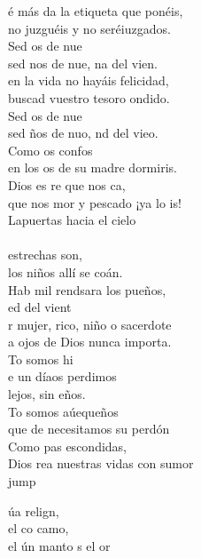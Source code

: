 \begin{cancion}%
	é más da la etiqueta que ponéis,\\
	no juzguéis y no seréiuzgados.\\
	Sed os de nue \\
	sed nos de nue, na del vien. \\
	 en la vida no hayáis felicidad,\\
	buscad vuestro tesoro ondido.\\
	Sed os de nue \\
	sed ños de nuo, nd del vieo.\\
	Como os confos \\
	en los os de su madre dormiris.\\
	Dios es re que nos ca,\\
	que nos mor y pescado ¡ya lo is!\\
	Lapuertas hacia el cielo \\
	\jump\\
estrechas son,\\
	los niños allí se coán.\\
	Hab mil rendsara los pueños,\\
	ed del vient\\
	r mujer, rico, niño o sacerdote\\
	a ojos de Dios nunca importa.\\
	To somos hi \\
	e un díaos perdimos\\
	 lejos, sin eños.\\
	To somos aúequeños\\
	que de  necesitamos su perdón\\
	Como pas escondidas,\\
	Dios rea nuestras vidas con sumor\\jump\\
	\begin{chorus}%
	úa relign,  \\
	el co camo,\\
	el ún manto s el or \\
	\end{chorus}%
	\jump\\
\end{cancion}%
